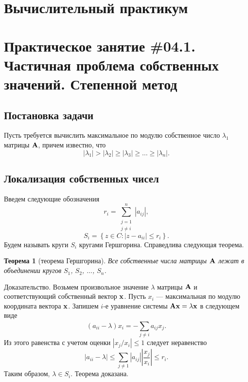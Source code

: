 \documentclass[12pt]{article}
\newtheorem{theorem}{Теорема}
\begin{document}
    \begin{flushright}
	\end{flushright}
	\begin{flushright}
	\end{flushright}
    \section*{Вычислительный практикум}
    \section*{Практическое занятие \#04.1. Частичная проблема собственных значений. Степенной метод}

	\subsection*{Постановка задачи}
	
	Пусть требуется вычислить максимальное по модулю собственное число $\lambda_1$ матрицы $\bold{A}$, причем известно, что
	\begin{equation}
		\left|\lambda_1\right|>\left|\lambda_2\right|\geqslant\left|\lambda_3\right|\geqslant\ldots\geqslant\left|\lambda_n\right|.\label{fm0}
	\end{equation}
	
	\subsection*{Локализация собственных чисел}
	
	Введем следующие обозначения 
	\begin{equation}
		r_i=\sum_{\substack{j=1\\j\neq i}}^{n}\left|a_{ij}\right|,
	\end{equation}
	\begin{equation}
		S_i=\left\{z\in C : \left|z-a_{ii}\right|\leqslant r_i \right\}.
	\end{equation}
	Будем называть круги $S_i$ кругами Гершгорина. Справедлива следующая теорема.	
	\begin{theorem}[теорема Гершгорина]
		Все собственные числа матрицы $\bold{A}$ лежат в объединении кругов $S_1$, $S_2$, $\ldots$, $S_n$.
	\end{theorem}
	Доказательство. Возьмем произвольное значение $\lambda$ матрицы $\bold{A}$ и соответствующий собственный вектор $\bold{x}$. Пусть $x_i$ --- максимальная по модулю координата вектора $\bold{x}$. Запишем $i$-е уравнение системы $\bold{Ax}=\lambda\bold{x}$ в следующем виде
	\begin{equation}
		(a_{ii}-\lambda)x_i=-\sum_{j\neq i}^{}a_{ij}x_j.
	\end{equation}
	Из этого равенства с учетом оценки $\left|x_j/x_i\right|\leqslant 1$ следует неравенство
	\begin{equation}
		\left|a_{ii}-\lambda\right|\leqslant\sum_{j\neq 1}\left|a_{ij}\right|\left|\frac{x_j}{x_i}\right|\leqslant r_i.
	\end{equation}
	Таким образом, $\lambda\in S_i$. Теорема доказана.
	
\end{document}
